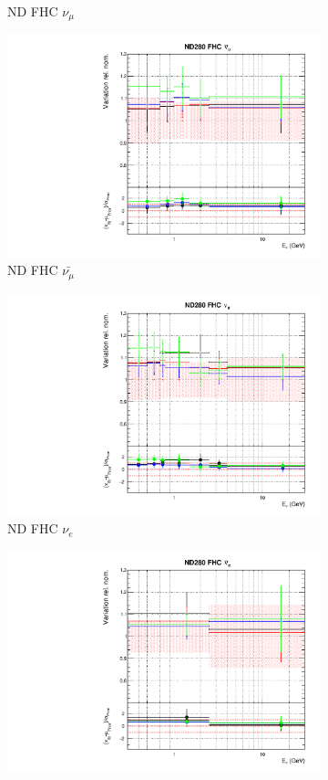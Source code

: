 \begin{figure}[!htbp]
\begin{subfigure}{0.45\textwidth}
  \caption{ND FHC $\nu_{\mu}$}
\end{subfigure}
\begin{subfigure}{0.45\textwidth}
  \centering
  \includegraphics[width=0.75\linewidth]{figs/detcovbinflux_1}
  \caption{ND FHC $\bar{\nu_{\mu}}$}
\end{subfigure}
\begin{subfigure}{0.45\textwidth}
  \centering
  \includegraphics[width=0.75\linewidth]{figs/detcovbinflux_2}
  \caption{ND FHC $\nu_e$}
\end{subfigure}
\begin{subfigure}{0.45\textwidth}
  \centering
  \includegraphics[width=0.75\linewidth]{figs/detcovbinflux_3}

\end{subfigure}
\end{figure}
